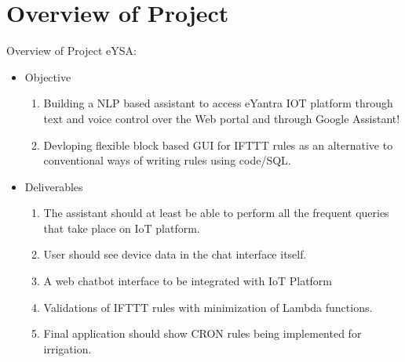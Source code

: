 \documentclass[10pt, a4paper]{beamer}
\begin{document}
\section{Overview of Project}
\begin{frame}{Overview of Project}
	eYSA:
	\begin{itemize}
		\item Objective
		\begin{enumerate}	
			\item Building a NLP based assistant to access eYantra IOT platform  through text and voice control over the Web portal and through Google Assistant!
			\item Devloping flexible block based GUI for IFTTT rules as an alternative to conventional ways of writing rules using code/SQL.
		\end{enumerate}
		\item Deliverables 
		\begin{enumerate}
			\item The assistant should at least be able to perform all the frequent queries that take place on IoT platform.
			\item User should see device data in the chat interface itself.
			\item A web chatbot interface to be integrated with IoT Platform
			\item Validations of IFTTT rules with minimization of Lambda functions.
			\item Final application should show CRON rules being implemented for irrigation.
		\end{enumerate}
	\end{itemize}
\end{frame}
\end{document}
